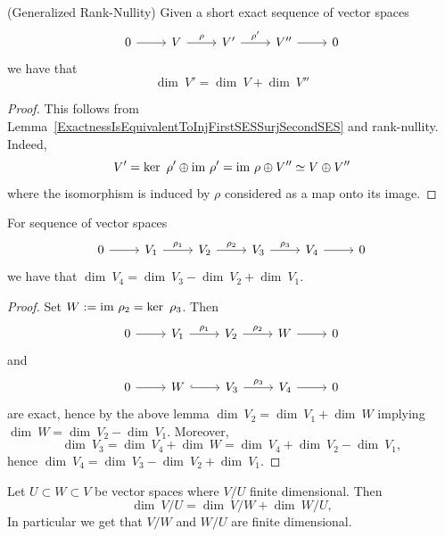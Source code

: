 \begin{lemma}\label{DimensionsOfExactSequence}(Generalized Rank-Nullity)
        Given a short exact sequence of vector spaces
         $$\begin{tikzcd}
            0 \arrow[r] &V \arrow[r,"\rho"] & V' \arrow[r,"\rho'"] & V'' \arrow[r] & 0
        \end{tikzcd}$$
        we have that 
        $$\dim\ V'= \dim \ V + \dim \ V''$$
    \end{lemma}
    \begin{proof}
        This follows from Lemma~\ref{ExactnessIsEquivalentToInjFirstSESSurjSecondSES} and rank-nullity. Indeed, 
        $$
            V' = \ker\ \rho' \oplus \mathrm{im} \ \rho' = \mathrm{im} \ \rho\oplus V'' \simeq V\oplus V''  
        $$
        where the isomorphism is induced by $\rho$ considered as a map onto its image.
    \end{proof}
    \begin{proposition}
        For sequence of vector spaces
         $$\begin{tikzcd}
            0 \arrow[r] & V_1 \arrow[r,"\rho_1"] & V_2 \arrow[r,"\rho_2"] & V_3 \arrow[r,"\rho_3"] & V_4 \arrow[r] & 0
        \end{tikzcd}$$
        we have that 
        $\dim \ V_4 = \dim \ V_3 -\dim \ V_2 + \dim \ V_1$.
    \end{proposition}
    \begin{proof}
        Set $W := \mathrm{im} \ \rho_2 = \ker \ \rho_3$. Then 
        $$\begin{tikzcd}
            0 \arrow[r] & V_1 \arrow[r,"\rho_1"] & V_2 \arrow[r,"\rho_2"] & W \arrow[r] & 0 
        \end{tikzcd}$$
        and 
        $$\begin{tikzcd}
            0\arrow[r] &W \arrow[hookrightarrow,r] &V_3 \arrow[r, "\rho_3"] &V_4 \arrow[r] &0
        \end{tikzcd}$$
        are exact, hence by the above lemma $\dim \ V_2 = \dim \ V_1 +\dim \ W$ implying $\dim \ W = \dim \ V_2- \dim \ V_1$. Moreover, 
        $$\dim\ V_3 = \dim \ V_4 +\dim \ W = \dim \ V_4 +\dim \ V_2 - \dim \ V_1,$$
        hence $\dim \ V_4 = \dim \ V_3 -\dim \ V_2 +\dim \ V_1.$
    \end{proof}
    \begin{lemma}\label{SecondIsomorphismTheoremForVS}
        Let $U\subset W\subset V$ be vector spaces where $V/U$ finite dimensional. Then 
        $$\dim\ V/U = \dim \ V/W+ \dim \ W/U,$$
        In particular we get that $V/W$ and $W/U$ are finite dimensional. 
    \end{lemma}
